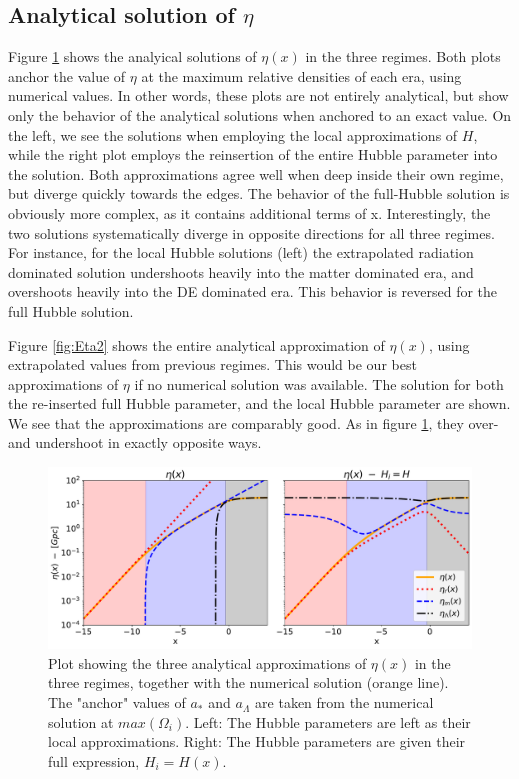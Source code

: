 \documentclass[10pt, a4paper]{article}
\begin{document}
\subsection{Analytical solution of $\eta$}
Figure \ref{fig:Eta} shows the analyical solutions of $\eta(x)$ in the three regimes. Both plots anchor the value of $\eta$ at the maximum relative densities of each era, using numerical values. In other words, these plots are not entirely analytical, but show only the behavior of the analytical solutions when anchored to an exact value. On the left, we see the solutions when employing the local approximations of $H$, while the right plot employs the reinsertion of the entire Hubble parameter into the solution. Both approximations agree well when deep inside their own regime, but diverge quickly towards the edges. The behavior of the full-Hubble solution is obviously more complex, as it contains additional terms of x. Interestingly, the two solutions systematically diverge in opposite directions for all three regimes. For instance, for the local Hubble solutions (left) the extrapolated radiation dominated solution undershoots heavily into the matter dominated era, and overshoots heavily into the DE dominated era. This behavior is reversed for the full Hubble solution.

Figure \ref{fig:Eta2} shows the entire analytical approximation of $\eta(x)$, using extrapolated values from previous regimes. This would be our best approximations of $\eta$ if no numerical solution was available. The solution for both the re-inserted full Hubble parameter, and the local Hubble parameter are shown. We see that the approximations are comparably good. As in figure \ref{fig:Eta}, they over- and undershoot in exactly opposite ways.

\begin{figure}[H]
    \centering
    \includegraphics[scale=0.5]{../m1_figs/Eta.pdf}
    \caption{Plot showing the three analytical approximations of $\eta(x)$ in the three regimes, together with the numerical solution (orange line). The "anchor" values of $a_*$ and $a_\Lambda$ are taken from the numerical solution at $max(\Omega_i)$. Left: The Hubble parameters are left as their local approximations. Right: The Hubble parameters are given their full expression, $H_i = H(x)$.}
    \label{fig:Eta}
\end{figure}
\end{document}
